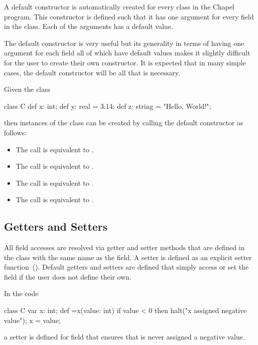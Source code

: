 A default constructor is automatically created for every class in the
Chapel program.  This constructor is defined such that it has one
argument for every field in the class.  Each of the arguments has a
default value.

The default constructor is very useful but its generality in terms of
having one argument for each field all of which have default values
makes it slightly difficult for the user to create their own
constructor.  It is expected that in many simple cases, the default
constructor will be all that is necessary.

\begin{example}
Given the class
\begin{chapel}
class C {
  def x: int;
  def y: real = 3.14;
  def z: string = "Hello, World!";
}
\end{chapel}
then instances of the class can be created by calling the default
constructor as follows:
\begin{itemize}
\item The call  is equivalent to .
\item The call  is equivalent to .
\item The call  is equivalent to .
\item The call  is equivalent to .
\end{itemize}
\end{example}

\subsection{Getters and Setters}
\label{Getters_and_Setters}

All field accesses are resolved via getter and setter methods that are
defined in the class with the same name as the field.  A setter is
defined as an explicit setter
function~().  Default getters and
setters are defined that simply access or set the field if the user
does not define their own.

\begin{example}
In the code
\begin{chapel}
class C {
  var x: int;
  def =x(value: int) {
    if value < 0 then
      halt("x assigned negative value");
    x = value;
  }
}
\end{chapel}
a setter is defined for field  that ensures that  is
never assigned a negative value.
\end{example}

